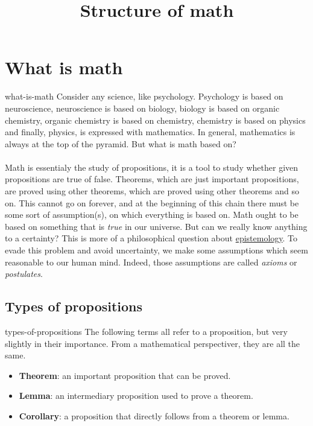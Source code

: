 \documentclass[preview]{standalone}
\begin{document}
\title{Structure of math}
\genpage

\section{What is math}

\begin{snippet}{what-is-math}
Consider any science, like psychology. Psychology is based on
neuroscience, neuroscience is based on biology,
biology is based on organic chemistry, organic chemistry is based on chemistry,
chemistry is based on physics and finally, physics, is expressed with mathematics.
In general, mathematics is always at the top of the pyramid.
But what is math based on?
\\\\
Math is essentialy the study of propositions,
it is a tool to study whether given propositions are true of false.
Theorems, which are just important propositions, are proved using other theorems,
which are proved using other theorems and so on. This cannot go on forever, and at the
beginning of this chain there must be some sort of assumption(s), on which everything
is based on.
Math ought to be based on something that is \textit{true} in our universe.
But can we really know anything to a certainty?
This is more of a philosophical question about \href{https://en.wikipedia.org/wiki/Epistemology}{epistemology}.
To evade this problem and avoid uncertainty, we make some assumptions which seem reasonable to our human mind.
Indeed, those assumptions are called \textit{axioms} or \textit{postulates}.
\end{snippet}


\subsection{Types of propositions}

\begin{snippet}{types-of-propositions}
The following terms all refer to a proposition, but very slightly in their importance.
From a mathematical perspectiver, they are all the same.
\\
\begin{itemize}
    \item \textbf{Theorem}: an important proposition that can be proved.
    \item \textbf{Lemma}: an intermediary proposition used to prove a theorem.
    \item \textbf{Corollary}: a proposition that directly follows from a theorem or lemma.
\end{itemize}
\end{snippet}
\end{document}
